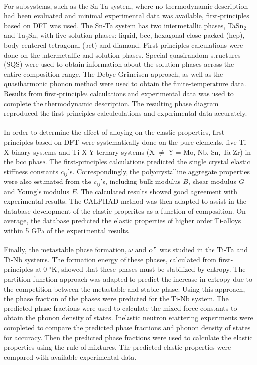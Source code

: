 \paragraph*{} For subsystems, such as the Sn-Ta system, where no thermodynamic description had been evaluated and minimal experimental data was available, first-principles based on DFT was used. The Sn-Ta system has two intermetallic phases, TaSn$_{2}$ and Ta$_{3}$Sn, with five solution phases: liquid, bcc, hexagonal close packed (hcp), body centered tetragonal (bct) and diamond. First-principles calculations were done on the intermetallic and solution phases. Special quasirandom structures (SQS) were used to obtain information about the solution phases across the entire composition range. The Debye-Gr\"uneisen approach, as well as the quasiharmonic phonon method were used to obtain the finite-temperature data. Results from first-principles calculations and experimental data was used to complete the thermodynamic description. The resulting phase diagram reproduced the first-principles calculculations and experimental data accurately.
\paragraph*{}In order to determine the effect of alloying on the elastic properties, first-principles based on DFT were systematically done on the pure elements, five Ti-X binary systems and Ti-X-Y ternary systems (X $\neq $ Y = Mo, Nb, Sn, Ta Zr) in the bcc phase. The first-principles calculations predicted the single crystal elastic stiffness constants $c_{ij}$'s. Correspondingly, the polycrystalline aggregate properties were also estimated from the $c_{ij}$'s, including bulk modulus $B$, shear modulus $G$ and Young's modulus $E$. The calculated results showed good agreement with experimental results. The CALPHAD method was then adapted to assist in the database development of the elastic properites as a function of composition. On average, the database predicted the elastic properties of higher order Ti-alloys within 5 GPa of the experimental results.
\paragraph*{} Finally, the metastable phase formation, $\omega$ and $\alpha"$ was studied in the Ti-Ta and Ti-Nb systems. The formation energy of these phases, calculated from first-principles at 0 $^\circ$K, showed that these phases must be stabilized by entropy. The partition function approach was adapted to predict the increase in entropy due to the competition between the metastable and stable phase. Using this approach, the phase fraction of the phases were predicted for the Ti-Nb system. The predicted phase fractions were used to calculate the mixed force constants to obtain the phonon density of states. Inelastic neutron scattering experiments were completed to compare the predicted phase fractions and phonon density of states for accuracy. Then the predicted phase fractions were used to calculate the elastic properties using the rule of mixtures. The predicted elastic properties were compared with available experimental data.
